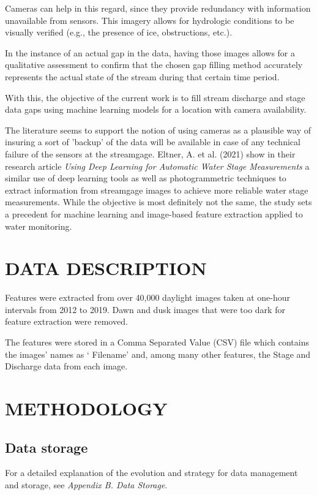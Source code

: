\documentclass[conference]{IEEEtran}
\begin{document}
Cameras can help in this regard, since they provide redundancy with information unavailable from sensors. This imagery allows for hydrologic conditions to be visually verified (e.g., the presence of ice, obstructions, etc.).

In the instance of an actual gap in the data, having those images allows for
a qualitative assessment to confirm that the chosen gap filling method accurately represents the actual state of the stream during that certain time period.

With this, the objective of the current work is to fill stream discharge and stage data gaps using machine learning models for a location with camera availability.

The literature seems to support the notion of using cameras as a plausible way of insuring a sort of 'backup' of the data will be available in case of any technical failure of the sensors at the streamgage. Eltner, A. et al. (2021) show in their
research article \textit{Using Deep Learning for Automatic Water Stage Measurements} \cite{dl-waterstage} a similar use of deep learning tools as well as photogrammetric techniques to extract information from streamgage images to achieve more reliable water stage measurements. While the objective is most definitely not the same, the study sets a precedent for machine learning and image-based feature extraction applied to water monitoring.

\section{DATA DESCRIPTION}
Features were extracted from over 40,000 daylight images taken at one-hour intervals from 2012 to 2019. Dawn and dusk images that were too dark for feature extraction were removed.

The features were stored in a Comma Separated Value (CSV) file which contains the images’ names as ‘ Filename’ and, among many other features, the Stage and Discharge data from each image.

\section{METHODOLOGY}
\subsection{\textbf{Data storage}}
For a detailed explanation of the evolution and strategy for data management and storage, see \textit{Appendix B. Data Storage}.
\end{document}
